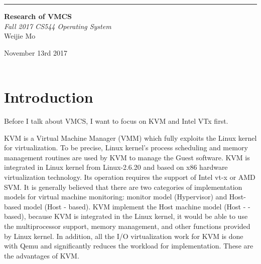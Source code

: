 \documentclass[10pt,draftclsnofoot,peerreview,letterpaper,onecolumn,]{IEEEtran}
\begin{document}
\begin{titlepage} %
	
	\raggedleft %
	
	\rule{1pt}{\textheight} %
	\hspace{0.05\textwidth} %
	\parbox[b]{0.75\textwidth}{ %
		
		{\Huge\bfseries Research of VMCS }\\[2\baselineskip] %
		{\large\textit{Fall 2017 CS544 Operating System}}\\[4\baselineskip] %
		{\Large Weijie Mo} %
		
		\vspace{0.5\textheight} %
		
		{\noindent November 13rd 2017}\\[\baselineskip] %
        {\noindent }\\[\baselineskip] %
	}

\end{titlepage}

\section{Introduction}

Before I talk about VMCS, I want to focus on KVM and Intel VTx first.

KVM is a Virtual Machine Manager (VMM) which fully exploits the Linux kernel for virtualization. To be precise, Linux kernel’s process scheduling and memory management routines are used by KVM to manage the Guest software. KVM is integrated in Linux kernel from Linux-2.6.20 and based on x86 hardware virtualization technology. Its operation requires the support of Intel vt-x or AMD SVM. It is generally believed that there are two categories of implementation models for virtual machine monitoring: monitor model (Hypervisor) and Host-based model (Host - based). KVM implement the Host machine model (Host - -based), because KVM is integrated in the Linux kernel, it would be able to use the multiprocessor support, memory management, and other functions provided by Linux kernel. In addition, all the I/O virtualization work for KVM is done with Qemu and significantly reduces the workload for implementation. These are the advantages of KVM.
\end{document}
